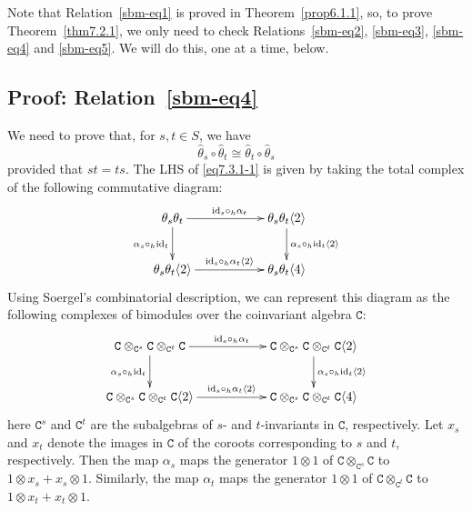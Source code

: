 \documentclass[a4paper]{amsart}
\begin{document}
Note that Relation~\ref{sbm-eq1} is proved in Theorem~\ref{prop6.1.1},
so, to prove Theorem~\ref{thm7.2.1}, we only need to check
Relations~\ref{sbm-eq2}, \ref{sbm-eq3}, \ref{sbm-eq4} and \ref{sbm-eq5}.
We will do this, one at a time, below.

\subsection{Proof: Relation~\ref{sbm-eq4}}\label{s7.3}

We need to prove that, for $s,t\in S$, we have 
\begin{equation}\label{eq7.3.1-1}
\hat{\theta}_s\circ \hat{\theta}_t
\cong \hat{\theta}_t\circ \hat{\theta}_s
\end{equation}
provided that $st=ts$. 
The LHS of \eqref{eq7.3.1-1}
is given by taking the total complex of the following commutative diagram:
\begin{equation}\label{eq7.3.1-3}
\xymatrix{
\theta_s\theta_t\ar[rr]^{\mathrm{id}_s\circ_h\alpha_t} 
\ar[d]_{\alpha_s\circ_h\mathrm{id}_t}&& 
\theta_s\theta_t\langle 2\rangle\ar[d]^{\alpha_s\circ_h\mathrm{id}_t\langle 2\rangle}\\
\theta_s\theta_t\langle 2\rangle
\ar[rr]^{\mathrm{id}_s\circ_h\alpha_t\langle 2\rangle} 
&& \theta_s\theta_t\langle 4\rangle\\
} 
\end{equation}
Using Soergel's combinatorial description, we can represent this
diagram as the following complexes of bimodules over the coinvariant 
algebra  $\mathtt{C}$:
\begin{equation}\label{eq7.3.1-5}
\xymatrix{
\mathtt{C}\otimes_{\mathtt{C}^s}\mathtt{C}
\otimes_{\mathtt{C}^t}\mathtt{C}
\ar[rr]^{\mathrm{id}_s\circ_h\alpha_t} 
\ar[d]_{\alpha_s\circ_h\mathrm{id}_t}&& 
\mathtt{C}\otimes_{\mathtt{C}^s}\mathtt{C}
\otimes_{\mathtt{C}^t}\mathtt{C}
\langle 2\rangle\ar[d]^{\alpha_s\circ_h\mathrm{id}_t\langle 2\rangle}\\
\mathtt{C}\otimes_{\mathtt{C}^s}\mathtt{C}
\otimes_{\mathtt{C}^t}\mathtt{C}\langle 2\rangle
\ar[rr]^{\mathrm{id}_s\circ_h\alpha_t\langle 2\rangle} 
&&\mathtt{C}\otimes_{\mathtt{C}^s}\mathtt{C}
\otimes_{\mathtt{C}^t}\mathtt{C}\langle 4\rangle\\
}  
\end{equation}
here $\mathtt{C}^s$ and $\mathtt{C}^t$ are the subalgebras of 
$s$- and $t$-invariants in $\mathtt{C}$, respectively.
Let $x_s$ and $x_t$ denote the images in $\mathtt{C}$ of the 
coroots corresponding to $s$ and $t$, respectively. Then the 
map $\alpha_s$ maps the generator $1\otimes 1$ of 
$\mathtt{C}\otimes_{\mathtt{C}^s}\mathtt{C}$ to
$1\otimes x_s+ x_s\otimes 1$. Similarly, the 
map $\alpha_t$ maps the generator $1\otimes 1$ of 
$\mathtt{C}\otimes_{\mathtt{C}^t}\mathtt{C}$ to
$1\otimes x_t+ x_t\otimes 1$. 
  
\end{document}
